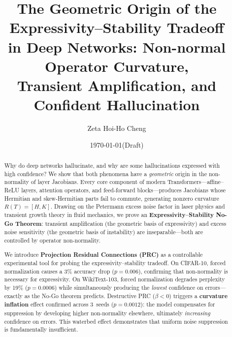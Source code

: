 \documentclass[11pt,a4paper]{article}
\title{The Geometric Origin of the Expressivity--Stability Tradeoff\\
in Deep Networks: Non-normal Operator Curvature,\\
Transient Amplification, and Confident Hallucination}
\author{Zeta Hoi-Ho Cheng}
\date{\today \quad (Draft)}
\theoremstyle{definition}
\begin{document}
\maketitle

\begin{abstract}
Why do deep networks hallucinate, and why are some hallucinations
expressed with high confidence? We show that both phenomena have a
\emph{geometric} origin in the non-normality of layer Jacobians.
Every core component of modern Transformers---affine--ReLU layers,
attention operators, and feed-forward blocks---produces Jacobians
whose Hermitian and skew-Hermitian parts fail to commute, generating
nonzero curvature $R(T) = [H,K]$. Drawing on the Petermann excess
noise factor in laser physics and transient growth theory in fluid
mechanics, we prove an \textbf{Expressivity--Stability No-Go Theorem}:
transient amplification (the geometric basis of expressivity) and
excess noise sensitivity (the geometric basis of instability) are
inseparable---both are controlled by operator non-normality.

We introduce \textbf{Projection Residual Connections (PRC)} as a
controllable experimental tool for probing the expressivity--stability
tradeoff. On CIFAR-10, forced normalization causes a 3\% accuracy
drop ($p = 0.006$), confirming that non-normality is necessary for
expressivity. On WikiText-103, forced normalization degrades
perplexity by 19\% ($p = 0.0006$) while simultaneously producing
the \emph{lowest} confidence on errors---exactly as the No-Go
theorem predicts. Destructive PRC ($\beta < 0$) triggers a
\textbf{curvature inflation} effect confirmed across 3~seeds
($p = 0.0012$): the model compensates for suppression by developing
higher non-normality elsewhere, ultimately \emph{increasing}
confidence on errors. This waterbed effect demonstrates that uniform
noise suppression is fundamentally insufficient.


\end{abstract}
\end{document}
